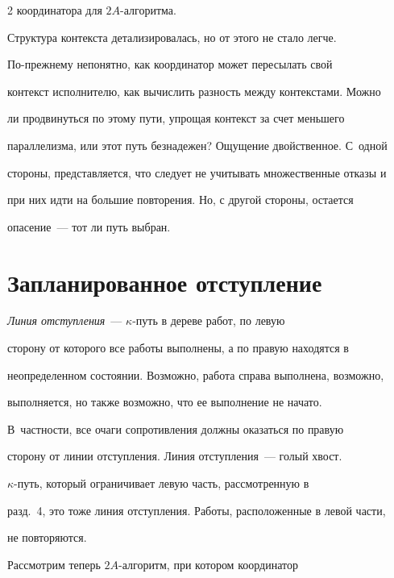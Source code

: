 \begin{multicols}{2}
координатора для $2A$-ал\-го\-ритма. 


      


      Структура контекста детализировалась, но от этого не стало легче. 


По-преж\-не\-му непонятно, как координатор может пересылать свой 


контекст исполнителю, как вычислить разность между контекстами. Можно 


ли продвинуться по этому пути, упрощая контекст за счет меньшего 


параллелизма, или этот путь безнадежен? Ощущение двойственное. С~одной 


стороны, представляется, что следует не учитывать множественные отказы и 


при них идти на большие повторения. Но, с другой стороны, остается 


опасение~--- тот ли путь выбран.





\section{Запланированное отступление}


      


      \textit{Линия отступления}~--- $\kappa$-путь в дереве работ, по левую 


сторону от которого все работы выполнены, а по правую находятся в 


неопределенном со\-сто\-янии. Возможно, работа справа выполнена, возможно, 


выполняется, но также возможно, что ее выполнение не начато. 


      В~част\-ности, все очаги сопротивления должны оказаться по правую 


сторону от линии отступления. Линия отступления~--- голый хвост. 


      $\kappa$-путь, который ограничивает левую часть, рассмотренную в 


разд.~4, это тоже линия отступления. Работы, расположенные в левой части, 


не повторяются. 


      


      Рассмотрим теперь $2A$-ал\-го\-ритм, при котором координатор 



\end{multicols}
